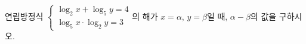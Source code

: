 연립방정식 $\begin{cases} \log_2 x+\log_5 y=4 \\ \log_5 x\cdot\log_2 y=3 \end{cases}$의 해가 $x=\alpha$, $y=\beta$일 때, $\alpha-\beta$의 값을 구하시오. \dmcondfill{$\alpha>\beta$}{}
